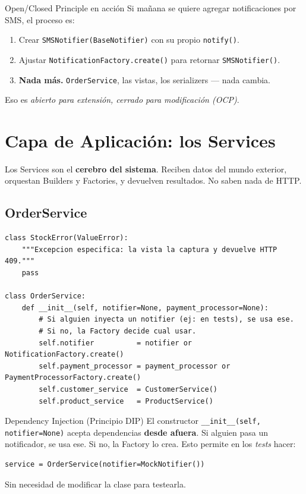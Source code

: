\documentclass[12pt, a4paper]{article}
\begin{document}
\begin{tipbox}{Open/Closed Principle en acción}
Si mañana se quiere agregar notificaciones por SMS, el proceso es:
\begin{enumerate}[noitemsep]
  \item Crear \texttt{SMSNotifier(BaseNotifier)} con su propio \texttt{notify()}.
  \item Ajustar \texttt{NotificationFactory.create()} para retornar \texttt{SMSNotifier()}.
  \item \textbf{Nada más.} \texttt{OrderService}, las vistas, los serializers — nada cambia.
\end{enumerate}
Eso es \textit{abierto para extensión, cerrado para modificación (OCP)}.
\end{tipbox}

\section{Capa de Aplicación: los Services}

Los Services son el \textbf{cerebro del sistema}. Reciben datos del mundo
exterior, orquestan Builders y Factories, y devuelven resultados.
No saben nada de HTTP.

\subsection{OrderService}

\begin{lstlisting}[caption={orders/services.py -- Constructor con inyección de dependencias}]
class StockError(ValueError):
    """Excepcion especifica: la vista la captura y devuelve HTTP 409."""
    pass

class OrderService:
    def __init__(self, notifier=None, payment_processor=None):
        # Si alguien inyecta un notifier (ej: en tests), se usa ese.
        # Si no, la Factory decide cual usar.
        self.notifier          = notifier or NotificationFactory.create()
        self.payment_processor = payment_processor or PaymentProcessorFactory.create()
        self.customer_service  = CustomerService()
        self.product_service   = ProductService()
\end{lstlisting}

\begin{conceptbox}{Dependency Injection (Principio DIP)}
El constructor \texttt{\_\_init\_\_(self, notifier=None)} acepta dependencias
\textbf{desde afuera}. Si alguien pasa un notificador, se usa ese. Si no, la Factory
lo crea. Esto permite en los \textit{tests} hacer:
\begin{verbatim}
service = OrderService(notifier=MockNotifier())
\end{verbatim}
Sin necesidad de modificar la clase para testearla.
\end{conceptbox}
\end{document}

